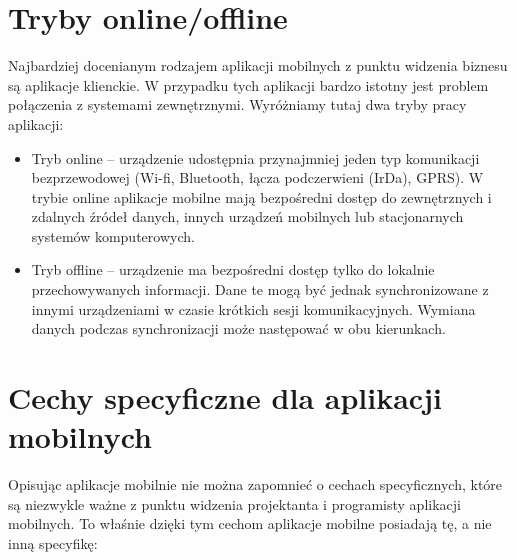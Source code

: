 \section{Tryby online/offline}
\label{sec:trybyAplikacjiMobilnych}

Najbardziej docenianym rodzajem aplikacji mobilnych z punktu widzenia biznesu są aplikacje klienckie. W przypadku tych aplikacji bardzo istotny jest problem połączenia z systemami zewnętrznymi. Wyróżniamy tutaj dwa tryby pracy aplikacji:

\begin{itemize}
\item Tryb online -- urządzenie udostępnia przynajmniej jeden typ komunikacji bezprzewodowej (Wi-fi, Bluetooth, łącza podczerwieni (IrDa), GPRS). W trybie online aplikacje mobilne mają bezpośredni dostęp do zewnętrznych i zdalnych źródeł danych, innych urządzeń mobilnych lub stacjonarnych systemów komputerowych.   
\item Tryb offline -- urządzenie ma bezpośredni dostęp tylko do lokalnie przechowywanych informacji. Dane te mogą być jednak synchronizowane z innymi urządzeniami w czasie krótkich sesji komunikacyjnych. Wymiana danych podczas synchronizacji może następować w obu kierunkach. 
\end{itemize}

\section{Cechy specyficzne dla aplikacji mobilnych }
\label{sec:cechyAplikacjiMobilnych}

Opisując aplikacje mobilnie nie można zapomnieć o cechach specyficznych, które są niezwykle ważne z punktu widzenia projektanta i programisty aplikacji mobilnych. To właśnie dzięki tym cechom aplikacje mobilne posiadają tę, a nie inną specyfikę:

